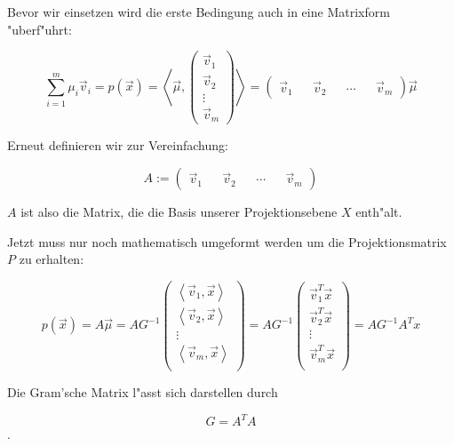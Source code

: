 \documentclass{article}
\newcommand{\lrangle}[1]{\left\langle #1 \right\rangle}
\begin{document}
Bevor wir einsetzen wird die erste Bedingung auch in eine Matrixform "uberf"uhrt:

	\begin{equation}
		\sum_{i=1}^{m}{\mu _i \vec{v}_i} = p(\vec{x}) = 
		\lrangle{\vec{\mu},
		\begin{pmatrix}
			\vec{v}_1 \\
			\vec{v}_2 \\
			\vdots \\
			\vec{v}_m
		\end{pmatrix}
		} =
		\begin{pmatrix}
			\vec{v}_1 &&
			\vec{v}_2 &&
			\cdots &&
			\vec{v}_m
		\end{pmatrix}
		\vec{\mu}
	\end{equation}

Erneut definieren wir zur Vereinfachung:

	\begin{equation}
		A :=
		\begin{pmatrix}
			\vec{v}_1 &&
			\vec{v}_2 &&
			\cdots &&
			\vec{v}_m
		\end{pmatrix}
	\end{equation}

\(A\) ist also die Matrix, die die Basis unserer Projektionsebene \(X\) enth"alt.

Jetzt muss nur noch mathematisch umgeformt werden um die Projektionsmatrix \(P\) zu erhalten:

	\begin{equation}
		p(\vec{x}) = A\vec{\mu} = AG^{-1}
		\begin{pmatrix}
			\lrangle{ \vec{v}_1, \vec{x} } \\
			\lrangle{ \vec{v}_2, \vec{x} } \\
			\vdots \\
			\lrangle{ \vec{v}_m, \vec{x} } \\
			\end{pmatrix}
		= AG^{-1}
		\begin{pmatrix}
			\vec{v}_{1}^{T} \vec{x} \\
			\vec{v}_{2}^{T} \vec{x} \\
			\vdots \\
			\vec{v}_{m}^{T} \vec{x} \\
		\end{pmatrix}
		= AG^{-1}A^T x
	\end{equation}

Die Gram'sche Matrix l"asst sich darstellen durch

	\begin{equation}
		G = A^T A
	\end{equation}.
\end{document}
